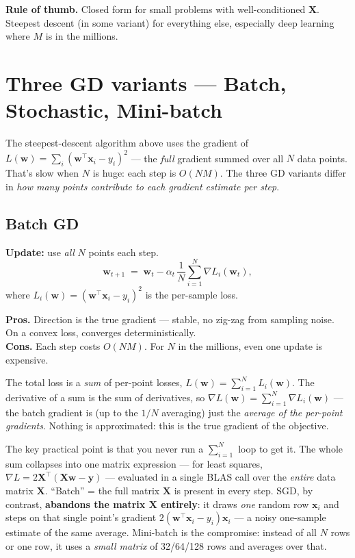 \documentclass[11pt, a4paper]{article}
\begin{document}
\textbf{Rule of thumb.} Closed form for small problems with well-conditioned $\mathbf{X}$. Steepest descent (in some variant) for everything else, especially deep learning where $M$ is in the millions.

\section{Three GD variants — Batch, Stochastic, Mini-batch}

The steepest-descent algorithm above uses the gradient of $L(\mathbf{w}) = \sum_i (\mathbf{w}^\top\mathbf{x}_i - y_i)^2$ — the \emph{full} gradient summed over all $N$ data points. That's slow when $N$ is huge: each step is $O(NM)$. The three GD variants differ in \emph{how many points contribute to each gradient estimate per step}.

\subsection{Batch GD}

\textbf{Update:} use \emph{all} $N$ points each step.
\[
\mathbf{w}_{t+1} \;=\; \mathbf{w}_t - \alpha_t\,\frac{1}{N}\sum_{i=1}^N \nabla L_i(\mathbf{w}_t),
\]
where $L_i(\mathbf{w}) = (\mathbf{w}^\top\mathbf{x}_i - y_i)^2$ is the per-sample loss.

\textbf{Pros.} Direction is the true gradient — stable, no zig-zag from sampling noise. On a convex loss, converges deterministically.\\
\textbf{Cons.} Each step costs $O(NM)$. For $N$ in the millions, even one update is expensive.

\begin{notebox}
The total loss is a \emph{sum} of per-point losses, $L(\mathbf{w}) = \sum_{i=1}^N L_i(\mathbf{w})$. The derivative of a sum is the sum of derivatives, so $\nabla L(\mathbf{w}) = \sum_{i=1}^N \nabla L_i(\mathbf{w})$ — the batch gradient is (up to the $1/N$ averaging) just the \emph{average of the per-point gradients}. Nothing is approximated: this is the true gradient of the objective.

The key practical point is that you never run a $\sum_{i=1}^N$ loop to get it. The whole sum collapses into one matrix expression — for least squares, $\nabla L = 2\mathbf{X}^\top(\mathbf{X}\mathbf{w}-\mathbf{y})$ — evaluated in a single BLAS call over the \emph{entire} data matrix $\mathbf{X}$. ``Batch'' = the full matrix $\mathbf{X}$ is present in every step. SGD, by contrast, \textbf{abandons the matrix $\mathbf{X}$ entirely}: it draws \emph{one} random row $\mathbf{x}_i$ and steps on that single point's gradient $2(\mathbf{w}^\top\mathbf{x}_i - y_i)\mathbf{x}_i$ — a noisy one-sample estimate of the same average. Mini-batch is the compromise: instead of all $N$ rows or one row, it uses a \emph{small matrix} of 32/64/128 rows and averages over that.
\end{notebox}
\end{document}
